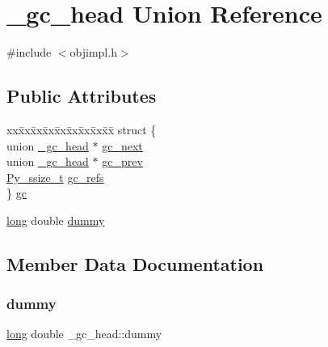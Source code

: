 \hypertarget{union__gc__head}{}\section{\+\_\+gc\+\_\+head Union Reference}
\label{union__gc__head}


{\ttfamily \#include $<$objimpl.\+h$>$}

\subsection*{Public Attributes}
\begin{DoxyCompactItemize}
\item 
\begin{tabbing}
xx\=xx\=xx\=xx\=xx\=xx\=xx\=xx\=xx\=\kill
struct \{\\
\>union \mbox{\hyperlink{union__gc__head}{\_gc\_head}} $\ast$ \mbox{\hyperlink{union__gc__head_a1ecfab1b9a966dd1d7f861e91dfb4431}{gc\_next}}\\
\>union \mbox{\hyperlink{union__gc__head}{\_gc\_head}} $\ast$ \mbox{\hyperlink{union__gc__head_ab555545d58e92dbb75891616a50502b5}{gc\_prev}}\\
\>\mbox{\hyperlink{pyport_8h_ac6411a3dfda9ac6feb9e8d859b1184bc}{Py\_ssize\_t}} \mbox{\hyperlink{union__gc__head_ac1c34c7f388c2eb1ab37198fafea082a}{gc\_refs}}\\
\} \mbox{\hyperlink{union__gc__head_a8c18537f7d7334632b95a32d4ba6ee82}{gc}}\\

\end{tabbing}\item 
\mbox{\hyperlink{modsupport_8h_a0cb68e00fb9fb1260ee2daadd9fe6611}{long}} double \mbox{\hyperlink{union__gc__head_ac3dd0fc3bbc73d3dffd5df3589c00939}{dummy}}
\end{DoxyCompactItemize}


\subsection{Member Data Documentation}
\mbox{\label{union__gc__head_ac3dd0fc3bbc73d3dffd5df3589c00939}} 
\subsubsection{\texorpdfstring{dummy}{dummy}}
{\footnotesize\ttfamily \mbox{\hyperlink{modsupport_8h_a0cb68e00fb9fb1260ee2daadd9fe6611}{long}} double \+\_\+gc\+\_\+head\+::dummy}

